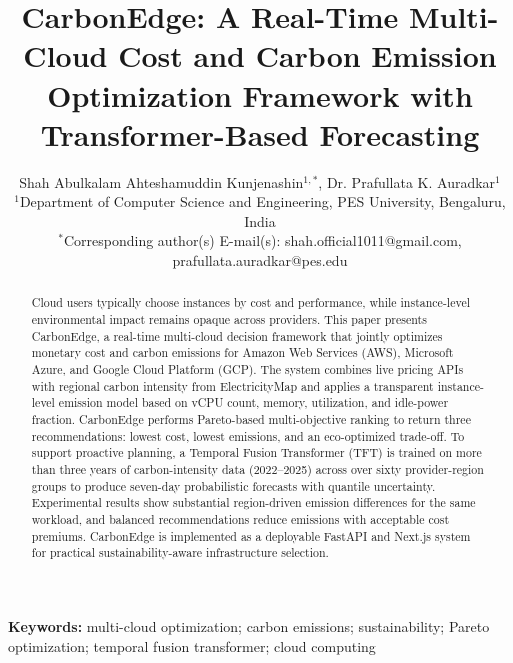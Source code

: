 \documentclass[12pt]{article}
\begin{document}
\title{CarbonEdge: A Real-Time Multi-Cloud Cost and Carbon Emission Optimization Framework with Transformer-Based Forecasting\\
}

\author{
\normalsize Shah Abulkalam Ahteshamuddin Kunjenashin$^{1,*}$, Dr. Prafullata K. Auradkar$^{1}$\\[4pt]
\small $^{1}$Department of Computer Science and Engineering, PES University, Bengaluru, India\\
\small $^{*}$Corresponding author(s) E-mail(s): \small {shah.official1011@gmail.com}, {prafullata.auradkar@pes.edu}\\
}
\date{}

\maketitle

\begin{abstract}
Cloud users typically choose instances by cost and performance, while instance-level environmental impact remains opaque across providers. This paper presents CarbonEdge, a real-time multi-cloud decision framework that jointly optimizes monetary cost and carbon emissions for Amazon Web Services (AWS), Microsoft Azure, and Google Cloud Platform (GCP). The system combines live pricing APIs with regional carbon intensity from ElectricityMap and applies a transparent instance-level emission model based on vCPU count, memory, utilization, and idle-power fraction. CarbonEdge performs Pareto-based multi-objective ranking to return three recommendations: lowest cost, lowest emissions, and an eco-optimized trade-off. To support proactive planning, a Temporal Fusion Transformer (TFT) is trained on more than three years of carbon-intensity data (2022--2025) across over sixty provider-region groups to produce seven-day probabilistic forecasts with quantile uncertainty. Experimental results show substantial region-driven emission differences for the same workload, and balanced recommendations reduce emissions with acceptable cost premiums. CarbonEdge is implemented as a deployable FastAPI and Next.js system for practical sustainability-aware infrastructure selection.
\end{abstract}

\noindent\textbf{Keywords:} multi-cloud optimization; carbon emissions; sustainability; Pareto optimization; temporal fusion transformer; cloud computing

\end{document}

